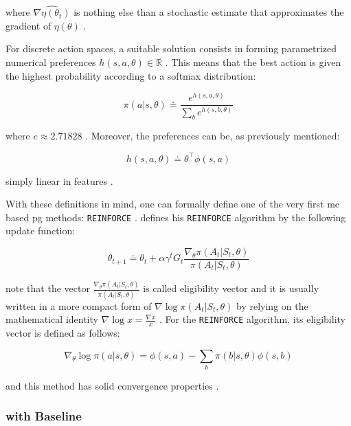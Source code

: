where $ \widehat{\nabla \eta (\theta_t)}$ is nothing else than a stochastic estimate that approximates the gradient of $\eta(\theta)$ \citep[p. 265]{Sutton2017}.

For discrete action spaces, a suitable solution consists in forming parametrized numerical preferences $h(s,a,\theta) \in \mathbb{R}$ \citep[p. 266]{Sutton2017}. This means that the best action is given the highest probability according to a softmax distribution:

\begin{equation}
\label{eq:probabilistic_preferences}
	\pi(a|s,\theta) \doteq \frac{e^{h(s,a,\theta)}}{\sum_b e^{h(s,b,\theta)}}
\end{equation}

where $e \approx 2.71828$ \citep[p. 266]{Sutton2017}. Moreover, the preferences can be, as previously mentioned:

\begin{equation}
\label{eq:dot_preferences}
	h(s,a,\theta) \doteq \theta^\top \phi (s,a)
\end{equation}

simply linear in features \citep[p. 266]{Sutton2017}.

With these definitions in mind, one can formally define one of the very first \gls{mc} based \gls{pg} methods: \texttt{REINFORCE} \citep{Williams1992}. \citet{Williams1992} defines his \texttt{REINFORCE} algorithm by the following update function:

\begin{equation}
	\theta_{t+1} \doteq \theta_t + \alpha \gamma^t G_t \frac{\nabla_\theta \pi(A_t|S_t,\theta)}{\pi(A_t|S_t,\theta)}
\end{equation}

note that the vector $\frac{\nabla_\theta \pi(A_t|S_t,\theta)}{\pi(A_t|S_t,\theta)}$ is called eligibility vector and it is usually written in a more compact form of $\nabla \log \pi(A_t|S_t,\theta)$ by relying on the mathematical identity $\nabla \log x = \frac{\nabla x}{x}$ \citep[p. 271]{Sutton2017}. For the \texttt{REINFORCE} algorithm, its eligibility vector is defined as follows:

\begin{equation}
	\nabla_\theta \log \pi (a|s,\theta) = \phi (s,a) - \sum_b \pi (b|s,\theta) \phi (s,b)
\end{equation}

and this method has solid convergence properties \citep[p. 271]{Sutton2017}.

\subsubsection{ with Baseline}

